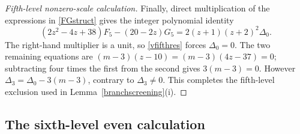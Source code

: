 \documentclass[10pt,a4paper]{amsart}
\begin{document}
\begin{proof}[Fifth-level nonzero-scale calculation]
Finally, direct multiplication of the expressions in \eqref{FGstruct}
gives the integer polynomial identity
\begin{equation*}
 (2z^2-4z+38)F_5-(20-2z)G_5
       =2(z+1)(z+2)^2\Delta_0.
\end{equation*}
The right-hand multiplier is a unit, so \eqref{vfifthres} forces
$\Delta_0=0$.  The two remaining equations are
$(m-3)(z-10)=(m-3)(4z-37)=0$; subtracting four times the first from the
second gives $3(m-3)=0$.  However
$\Delta_3=\Delta_0-3(m-3)$, contrary to $\Delta_3\ne0$.  This completes the fifth-level exclusion
used in Lemma~\ref{branchscreening}(i).
\end{proof}

\subsection{The sixth-level even calculation}\label{app:even}
\end{document}
